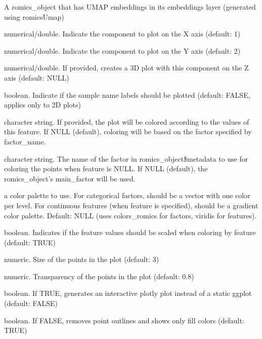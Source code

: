 \documentclass[a4paper]{book}
\begin{document}
%
\begin{Arguments}
\begin{ldescription}
\item[\code{romics\_object}] A romics\_object that has UMAP embeddings in its embeddings layer (generated using romicsUmap)

\item[\code{Xcomp}] numerical/double. Indicate the component to plot on the X axis (default: 1)

\item[\code{Ycomp}] numerical/double. Indicate the component to plot on the Y axis (default: 2)

\item[\code{Zcomp}] numerical/double. If provided, creates a 3D plot with this component on the Z axis (default: NULL)

\item[\code{label}] boolean. Indicate if the sample name labels should be plotted (default: FALSE, applies only to 2D plots)

\item[\code{feature}] character string. If provided, the plot will be colored according to the values of this feature.
If NULL (default), coloring will be based on the factor specified by factor\_name.

\item[\code{factor\_name}] character string. The name of the factor in romics\_object\$metadata to use for coloring the points
when feature is NULL. If NULL (default), the romics\_object's main\_factor will be used.

\item[\code{color\_palette}] a color palette to use. For categorical factors, should be a vector with one color per level.
For continuous features (when feature is specified), should be a gradient color palette.
Default: NULL (uses colors\_romics for factors, viridis for features).

\item[\code{standardize}] boolean. Indicates if the feature values should be scaled when coloring by feature (default: TRUE)

\item[\code{size}] numeric. Size of the points in the plot (default: 3)

\item[\code{alpha}] numeric. Transparency of the points in the plot (default: 0.8)

\item[\code{plotly}] boolean. If TRUE, generates an interactive plotly plot instead of a static ggplot (default: FALSE)

\item[\code{show\_outline}] boolean. If FALSE, removes point outlines and shows only fill colors (default: TRUE)
\end{ldescription}
\end{Arguments}
\end{document}
